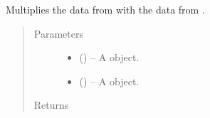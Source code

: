 \documentclass[letterpaper,10pt,openany,oneside,english]{sphinxmanual}
\begin{document}

\begin{fulllineitems}
\label{\detokenize{additional_functions:fredpy.times}}
Multiplies the data from  with the data from .
\begin{quote}\begin{description}
\item[{Parameters}] \leavevmode\begin{itemize}
\item {} 
 ({\hyperref[\detokenize{series_class:fredpy.series}]{}}) -- A {\hyperref[\detokenize{series_class:fredpy.series}]{}} object.

\item {} 
 ({\hyperref[\detokenize{series_class:fredpy.series}]{}}) -- A {\hyperref[\detokenize{series_class:fredpy.series}]{}} object.

\end{itemize}

\item[{Returns}] \leavevmode
{\hyperref[\detokenize{series_class:fredpy.series}]{}}

\end{description}\end{quote}

\end{fulllineitems}

\end{document}
